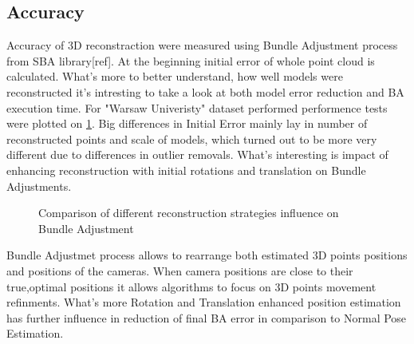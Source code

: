 \subsection{Accuracy}
Accuracy of 3D reconstraction were measured using Bundle Adjustment process from SBA library[ref]. At the beginning initial error of whole point cloud is calculated. What's more to better understand, how well models were reconstructed it's intresting to take a look at both model error reduction and BA execution time.
For "Warsaw Univeristy" dataset performed performence tests were plotted on \ref{plot:BAError}. Big differences in Initial Error mainly lay in number of reconstructed points and scale of models, which turned out to be more very different due to differences in outlier removals. What's interesting is impact of enhancing reconstruction with initial rotations and translation on Bundle Adjustments. 
\begin{figure}[ht!]
  \begin{center}
    \caption{Comparison of different reconstruction strategies influence on Bundle Adjustment}
    \label{plot:BAError}
  \end{center}
\end{figure}
\clearpage
Bundle Adjustmet process allows to rearrange both estimated 3D points positions and positions of the cameras. When camera positions are close to their true,optimal positions it allows algorithms to focus on 3D points movement refinments. What's more Rotation and Translation enhanced position estimation has further influence in reduction of final BA error in comparison to Normal Pose Estimation. 


